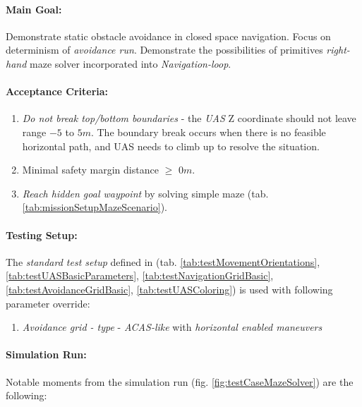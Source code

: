 \paragraph{Main Goal:} Demonstrate static obstacle avoidance in closed space navigation. Focus on determinism of \emph{avoidance run}. Demonstrate the possibilities of primitives \emph{right-hand} maze solver incorporated into \emph{Navigation-loop}.

\paragraph{Acceptance Criteria:}
\begin{enumerate}
    \item \emph{Do not break top/bottom boundaries} - the \emph{UAS} Z coordinate should not leave range $-5$ to $5 m$. The boundary break occurs when there is no feasible horizontal path, and UAS needs to climb up to resolve the situation.
    
    \item{Minimal safety margin distance} $\ge$ $0m$.
    
    \item\emph{Reach hidden goal waypoint} by solving simple maze (tab. \ref{tab:missionSetupMazeScenario}).
\end{enumerate}

\paragraph{Testing Setup:} The \emph{standard test setup} defined in (tab.  \ref{tab:testMovementOrientations}, \ref{tab:testUASBasicParameters}, \ref{tab:testNavigationGridBasic}, \ref{tab:testAvoidanceGridBasic}, \ref{tab:testUASColoring}) is used with following parameter override:

\begin{enumerate}
    \item \emph{Avoidance grid - type} - \emph{ACAS-like} with \emph{horizontal enabled maneuvers}
\end{enumerate}

\paragraph{Simulation Run:} Notable moments from  the simulation run (fig. \ref{fig:testCaseMazeSolver}) are the following:

